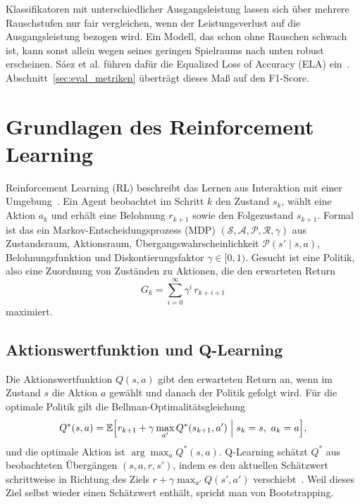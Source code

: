 Klassifikatoren mit unterschiedlicher Ausgangsleistung lassen sich über mehrere Rauschstufen nur fair vergleichen, wenn der Leistungsverlust auf die Ausgangsleistung bezogen wird. Ein Modell, das schon ohne Rauschen schwach ist, kann sonst allein wegen seines geringen Spielraums nach unten robust erscheinen. Sáez et al. führen dafür die Equalized Loss of Accuracy (ELA) ein~\autocite{saezEvaluatingClassifierBehavior2016}. Abschnitt~\ref{sec:eval_metriken} überträgt dieses Maß auf den F1-Score.

\section{Grundlagen des Reinforcement Learning}
\label{sec:rl_grundlagen}

Reinforcement Learning (RL) beschreibt das Lernen aus Interaktion mit einer Umgebung~\autocite{suttonReinforcementLearningIntroduction2018}. Ein Agent beobachtet im Schritt $k$ den Zustand $s_k$, wählt eine Aktion $a_k$ und erhält eine Belohnung $r_{k+1}$ sowie den Folgezustand $s_{k+1}$. Formal ist das ein Markov-Entscheidungsprozess (MDP) $(\mathcal{S},\mathcal{A},\mathcal{P},\mathcal{R},\gamma)$ aus Zustandsraum, Aktionsraum, Übergangswahrscheinlichkeit $\mathcal{P}(s'\mid s,a)$, Belohnungsfunktion und Diskontierungsfaktor $\gamma\in[0,1)$. Gesucht ist eine Politik, also eine Zuordnung von Zuständen zu Aktionen, die den erwarteten Return
\begin{equation}
	G_k=\sum_{i=0}^{\infty}\gamma^{i}\,r_{k+i+1}
\end{equation}
maximiert.

\subsection{Aktionswertfunktion und Q-Learning}
Die Aktionswertfunktion $Q(s,a)$ gibt den erwarteten Return an, wenn im Zustand $s$ die Aktion $a$ gewählt und danach der Politik gefolgt wird. Für die optimale Politik gilt die Bellman-Optimalitätsgleichung
\begin{equation}
	Q^{*}(s,a)=\mathbb{E}\Bigl[r_{k+1}+\gamma\max_{a'}Q^{*}(s_{k+1},a')\Bigm| s_k=s,\ a_k=a\Bigr],
	\label{eq:bellman}
\end{equation}
und die optimale Aktion ist $\arg\max_{a}Q^{*}(s,a)$. Q-Learning schätzt $Q^{*}$ aus beobachteten Übergängen $(s,a,r,s')$, indem es den aktuellen Schätzwert schrittweise in Richtung des Ziels $r+\gamma\max_{a'}Q(s',a')$ verschiebt~\autocite{suttonReinforcementLearningIntroduction2018}. Weil dieses Ziel selbst wieder einen Schätzwert enthält, spricht man von Bootstrapping.

